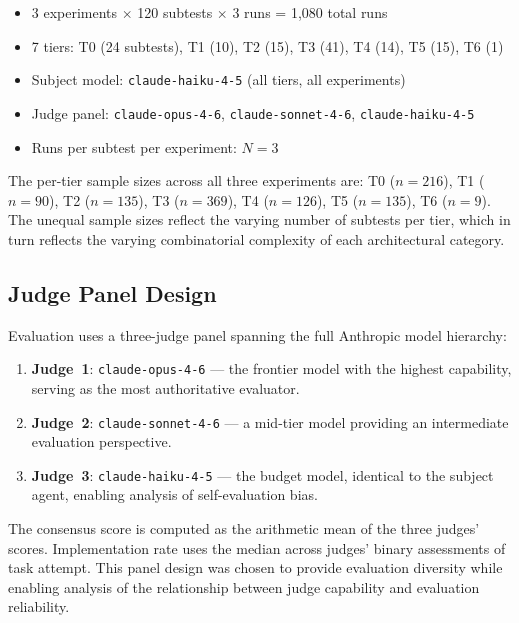 \documentclass[11pt]{article}
\begin{document}
\begin{itemize}
  \item 3 experiments $\times$ 120 subtests $\times$ 3 runs = 1,080 total runs
  \item 7 tiers: T0 (24 subtests), T1 (10), T2 (15), T3 (41), T4 (14),
    T5 (15), T6 (1)
  \item Subject model: \texttt{claude-haiku-4-5} (all tiers, all experiments)
  \item Judge panel: \texttt{claude-opus-4-6}, \texttt{claude-sonnet-4-6},
    \texttt{claude-haiku-4-5}
  \item Runs per subtest per experiment: $N=3$
\end{itemize}

The per-tier sample sizes across all three experiments are: T0 ($n=216$),
T1 ($n=90$), T2 ($n=135$), T3 ($n=369$), T4 ($n=126$), T5 ($n=135$),
T6 ($n=9$). The unequal sample sizes reflect the varying number of subtests
per tier, which in turn reflects the varying combinatorial complexity of each
architectural category.



\subsection{Judge Panel Design}
\label{sec:judge_panel}

Evaluation uses a three-judge panel spanning the full Anthropic model
hierarchy:

\begin{enumerate}
  \item \textbf{Judge~1}: \texttt{claude-opus-4-6} --- the frontier model with
    the highest capability, serving as the most authoritative evaluator.
  \item \textbf{Judge~2}: \texttt{claude-sonnet-4-6} --- a mid-tier model
    providing an intermediate evaluation perspective.
  \item \textbf{Judge~3}: \texttt{claude-haiku-4-5} --- the budget model,
    identical to the subject agent, enabling analysis of self-evaluation bias.
\end{enumerate}

The consensus score is computed as the arithmetic mean of the three judges'
scores. Implementation rate uses the median across judges' binary assessments
of task attempt. This panel design was chosen to provide evaluation diversity
while enabling analysis of the relationship between judge capability and
evaluation reliability.
\end{document}
